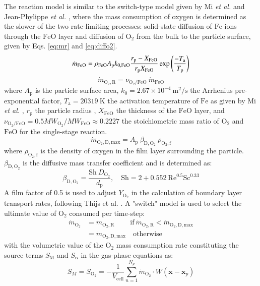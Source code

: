 \documentclass[times,twocolumn,final]{elsarticle}
\newcommand{\mrm}[1]{\mathrm{#1}}
\newcommand{\redd}{\color{red}}
\newcommand{\redd}{}
\begin{document}
{The reaction model is similar to the switch-type model given by Mi \textit{et al.} and Jean-Phylippe \textit{et al.} \cite{Mi2022,Jean_Philyppe_2023}, where the mass consumption of oxygen is determined as the slower of the two rate-limiting processes: solid-state diffusion of $\mathrm{Fe}$ ions through the $\mrm{FeO}$ layer and diffusion of $\mrm{O_2}$ from the bulk to the particle surface, given by Eqs. \ref{eq:mr} and \ref{eq:diffo2}.
\begin{equation}
    \dot{m}_\mrm{FeO} = \rho_\mrm{FeO} A_\mrm{p} k_\mrm{0,FeO}\frac{r_\mrm{p}- X_\mrm{FeO}}{r_\mrm{p} X_\mrm{FeO}} \exp \left( \frac{-T_\mrm{a}}{T_\mrm{p}}\right) \notag
\end{equation}
\begin{equation}
    \dot{m}_\mrm{O_2,R} = \nu_\mrm{O_2/FeO}\ \dot{m}_\mrm{FeO} \label{eq:mr}
\end{equation}
\noindent where $A_\mrm{p}$ is the particle surface area, $k_0 = 2.67\times10^{-4}\SI{}{\meter^2/\second}$ the Arrhenius pre-exponential factor, $T_\mrm{a} = \SI{20319}{\kelvin}$ the activation temperature of $\mrm{Fe}$ as given by Mi \textit{et al.} \cite{Mi2022}, $r_\mrm{p}$ the particle radius , $X_\mrm{FeO}$ the thickness of the $\mrm{FeO}$ layer, and {\redd $\nu_\mrm{O_2/FeO} = 0.5 \mathit{MW}_\mrm{O_2}/\mathit{MW}_\mrm{FeO}\approx0.2227$ the stoichiometric mass ratio of $\mrm{O_2}$ and $\mrm{FeO}$ for the single-stage reaction.}
\begin{equation}
    \dot{m}_\mrm{O_2,D,max} = A_\mrm{p}\ \beta_\mrm{D,O_2}\ \rho_\mrm{O_2,f} \label{eq:diffo2}
\end{equation}
\noindent where $\rho_\mrm{O_2,f}$ is the density of oxygen in the film layer surrounding the particle. $\beta_\mrm{D,O_2}$ is the diffusive mass transfer coefficient and is determined as:
\begin{equation}
    \beta_\mrm{D,O_2} = \frac{\mrm{Sh}\ D_\mrm{O_2}}{d_\mrm{p}}, \quad\mrm{Sh} = 2 + 0.552\ \mrm{Re}^{0.5}\mrm{Sc}^{0.33} \label{eq:betad}
\end{equation}
A film factor of 0.5 is used to adjust $Y_\mrm{O_2}$ in the calculation of boundary layer transport rates, following Thijs et al. \cite{Thijs2022}. A "switch" model is used to select the ultimate value of $\mrm{O_2}$ consumed per time-step:
\begin{equation}
    \begin{split}
        \dot{m}_\mrm{O_2} &= \dot{m}_\mrm{O_2,R}\quad\quad\: \mrm{if}\ \dot{m}_\mrm{O_2,R}<\dot{m}_\mrm{O_2,D,max} \\
        &= \dot{m}_\mrm{O_2,D,max} \quad \mrm{otherwise} \label{eq:mo2}
    \end{split}
\end{equation}
\noindent with the volumetric value of the $\mrm{O_2}$ mass consumption rate constituting the source terms $S_\mrm{M}$ and $S_\mrm{\alpha}$ in the gas-phase equations as:
\begin{equation}
    S_M = S_\mrm{O_2} = -\frac{1}{V_{\mrm{cell}}} \sum_{n=1}^{N_p} \dot{m}_\mrm{O_2} \cdot W(\mathbf{x} - \mathbf{x}_p) 
\end{equation}

}
\end{document}
